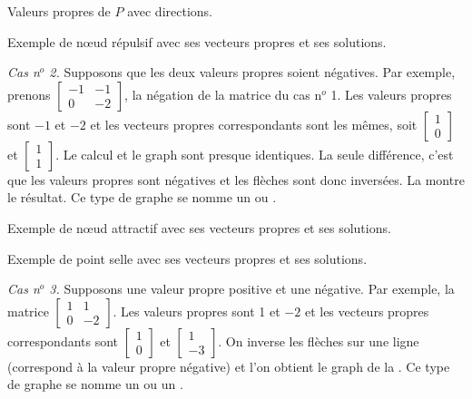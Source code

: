 \begin{myfig}
\parbox[t]{3.0in}{
 \capstart
 \caption{Valeurs propres de $P$ avec directions.\label{pln:source-eig-arrfig}}
}
\quad
\parbox[t]{3.0in}{
 \capstart
 \caption{Exemple de nœud répulsif avec ses vecteurs propres et ses
 solutions.\label{pln:source-fullfig}}
}
\end{myfig}

\medskip

\emph{Cas n$^o$ 2.} Supposons que les deux valeurs propres soient négatives. Par exemple, prenons
$\left[ \begin{smallmatrix} -1 & -1 \\ 0 & -2 \end{smallmatrix} \right]$, la négation de la matrice du cas n$^o$ 1.
Les valeurs propres sont $-1$ et $-2$ et les vecteurs propres correspondants sont les mêmes, soit
$\left[ \begin{smallmatrix} 1 \\ 0 \end{smallmatrix} \right]$ et
$\left[ \begin{smallmatrix} 1 \\ 1 \end{smallmatrix} \right]$.  Le calcul et le graph sont presque identiques. La seule différence, c’est que les valeurs propres sont négatives et les flèches sont donc inversées. La  montre le résultat. Ce type de graphe se nomme un \emph{} ou \emph{}.

\begin{myfig}
\parbox[t]{3.0in}{
 \capstart
 \caption{Exemple de nœud attractif avec ses vecteurs propres et ses
 solutions.\label{pln:sink-fullfig}}
}
\quad
\parbox[t]{3.0in}{
 \capstart
 \caption{Exemple de point selle avec ses vecteurs propres et ses
 solutions.\label{pln:saddle-fullfig}}
}
\end{myfig}

\medskip

\emph{Cas n$^o$ 3.} Supposons une valeur propre positive et une négative. Par exemple, la matrice
$\left[ \begin{smallmatrix} 1 & 1 \\ 0 & -2 \end{smallmatrix} \right]$.
Les valeurs propres sont 1 et $-2$ et les vecteurs propres correspondants sont
$\left[ \begin{smallmatrix} 1 \\ 0 \end{smallmatrix} \right]$ et
$\left[ \begin{smallmatrix} 1 \\ -3 \end{smallmatrix} \right]$.  On inverse les flèches sur une ligne (correspond à la valeur propre négative) et l'on obtient le graph de la .  Ce type de graphe se nomme un \emph{} ou un \emph{}.

